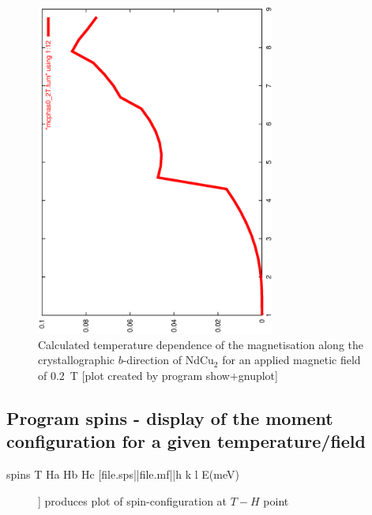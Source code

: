 \begin{figure}[hb]%
\begin{center}\leavevmode
\includegraphics[angle=-90, width=0.7\textwidth]{figsrc/ndcu2b/resultss/mag0_2T.ps}
\end{center}
\caption{Calculated temperature dependence of the magnetisation  along the crystallographic
$b$-direction  of NdCu$_2$ for an applied magnetic field of 0.2~T 
[plot created by program {\prg show+gnuplot}]}
\label{magnetizationgraphic}
\end{figure}


\subsection{Program {\prg spins} - display of the moment configuration for a given %
temperature/field}
\label{spins}

\begin{description} 
\item [spins T Ha Hb Hc [file.sps||file.mf||h k l E(meV)]]       produces plot of spin-configuration at $T-H$ %
point
\end{description} 

